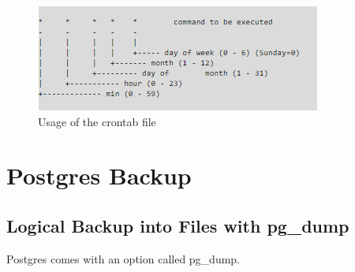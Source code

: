 \documentclass[10pt]{article}
\begin{document}
\begin{figure}[!h]
	\begin{center}
		\includegraphics[width=1.0\linewidth]{pictures/crontab}
		\caption{Usage of the crontab file\cite{crontabref}}
		\label{content}
	\end{center}
\end{figure}







\newpage
\section{Postgres Backup}
\subsection{Logical Backup into Files with pg\_dump}
Postgres comes with an option called pg\_dump. 
\end{document}
